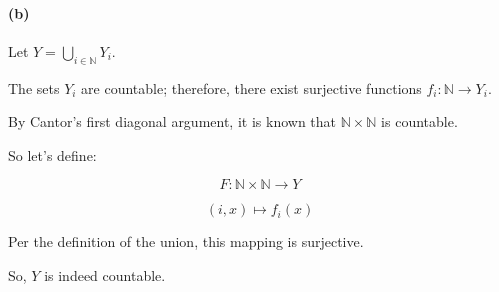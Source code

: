 \documentclass[12pt]{article}
\begin{document}
\paragraph{(b)}
Let \(Y = \bigcup_{i \in \mathbb{N}} Y_i\).

The sets \(Y_i\) are countable; therefore, there exist surjective functions \(f_i: \mathbb{N} \rightarrow Y_i\).

By Cantor's first diagonal argument, it is known that \(\mathbb{N} \times \mathbb{N}\) is countable.

So let's define:

\[ F: \mathbb{N} \times \mathbb{N} \rightarrow Y \]

\[ (i, x) \mapsto f_i(x) \]

Per the definition of the union, this mapping is surjective.

So, \(Y\) is indeed countable.
\end{document}

